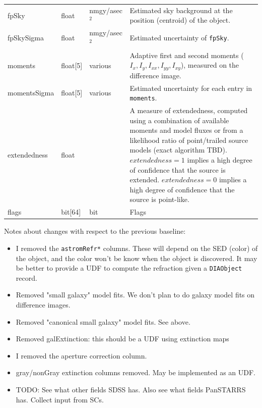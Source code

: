 \documentclass[12pt]{article}
\newcommand{\code}[1]{\texttt{#1}}
\newcommand{\DIAObject}{\code{DIAObject}\xspace}
\begin{document}
\begin{center}
\begin{longtable}{p{3cm}p{2cm}p{2cm}p{5cm}}
fpSky & float & nmgy/asec$^{2}$ & Estimated sky background at the position (centroid) of the object. \\ 

fpSkySigma & float & nmgy/asec$^{2}$ & Estimated uncertainty of \texttt{fpSky}. \\ 



moments & float[5] & various & Adaptive first and second moments ($I_{x}, I_{y}, I_{xx}, I_{yy}, I_{xy}$), measured on the difference image. \\ 

momentsSigma & float[5] & various & Estimated uncertainty for each entry in \texttt{moments}. \\ 

extendedness & float & ~ & A measure of extendedness, computed using a combination of available moments and model fluxes or from a likelihood ratio of point/trailed source models (exact algorithm TBD). $extendedness=1$ implies a high degree of confidence that the source is extended. $extendedness=0$ implies a high degree of confidence that the source is point-like. \\

flags & bit[64] & bit & Flags \\ \hline
\end{longtable}
\end{center}

\begin{changelog}
Notes about changes with respect to the previous baseline:
\begin{itemize}
\item I removed the \texttt{astromRefr*} columns. These will depend on the SED (color) of the object, and the color won't be know when the object is discovered. It may be better to provide a UDF to compute the refraction given a \DIAObject record.
\item Removed "small galaxy" model fits. We don't plan to do galaxy model fits on difference images.
\item Removed "canonical small galaxy" model fits. See above.
\item Removed galExtinction: this should be a UDF using extinction maps
\item I removed the aperture correction column.
\item gray/nonGray extinction columns removed. May be implemented as an UDF.
\item TODO: See what other fields SDSS has. Also see what fields PanSTARRS has. Collect input from SCs.
\end{itemize}
\end{changelog}
\end{document}
